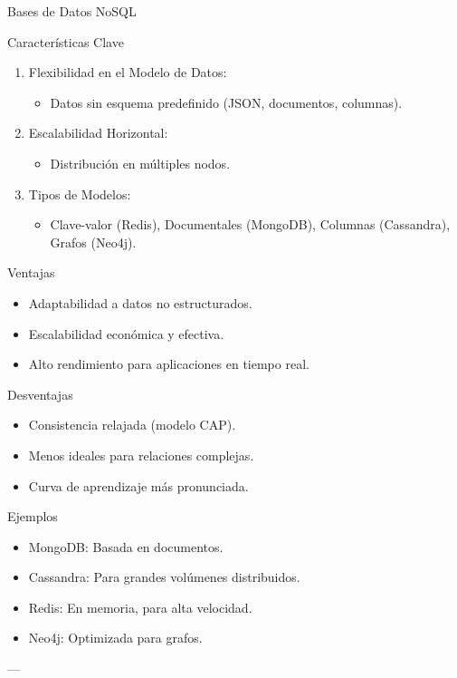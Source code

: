 \documentclass[presentation]{beamer}
\begin{document}
\begin{frame}[label={sec:orgfdf0edb}]{Bases de Datos NoSQL}
\begin{block}{Características Clave}
\begin{enumerate}
\item \alert{\alert{Flexibilidad en el Modelo de Datos}}:
\begin{itemize}
\item Datos sin esquema predefinido (JSON, documentos, columnas).
\end{itemize}
\item \alert{\alert{Escalabilidad Horizontal}}:
\begin{itemize}
\item Distribución en múltiples nodos.
\end{itemize}
\item \alert{\alert{Tipos de Modelos}}:
\begin{itemize}
\item Clave-valor (Redis), Documentales (MongoDB), Columnas (Cassandra), Grafos (Neo4j).
\end{itemize}
\end{enumerate}
\end{block}

\begin{block}{Ventajas}
\begin{itemize}
\item Adaptabilidad a datos no estructurados.
\item Escalabilidad económica y efectiva.
\item Alto rendimiento para aplicaciones en tiempo real.
\end{itemize}
\end{block}

\begin{block}{Desventajas}
\begin{itemize}
\item Consistencia relajada (modelo CAP).
\item Menos ideales para relaciones complejas.
\item Curva de aprendizaje más pronunciada.
\end{itemize}
\end{block}

\begin{block}{Ejemplos}
\begin{itemize}
\item \alert{\alert{MongoDB}}: Basada en documentos.
\item \alert{\alert{Cassandra}}: Para grandes volúmenes distribuidos.
\item \alert{\alert{Redis}}: En memoria, para alta velocidad.
\item \alert{\alert{Neo4j}}: Optimizada para grafos.
\end{itemize}

---
\end{block}
\end{frame}
\end{document}
